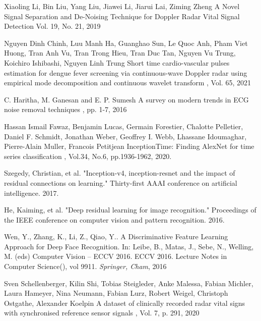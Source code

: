 \begin{bib}[100]
Xiaoling Li, Bin Liu, Yang Liu, Jiawei Li, Jiarui Lai, Ziming Zheng
\newblock A Novel Signal Separation and De-Noising Technique for Doppler Radar Vital Signal Detection
 Vol. 19, No. 21, 2019

Nguyen Dinh Chinh, Luu Manh Ha, Guanghao Sun, Le Quoc Anh, Pham Viet Huong, Tran Anh Vu, Tran Trong Hieu, Tran Duc Tan, Nguyen Vu Trung, Koichiro Ishibashi, Nguyen Linh Trung
\newblock Short time cardio-vascular pulses estimation for dengue fever screening via continuous-wave Doppler radar using empirical mode decomposition and continuous wavelet transform
, Vol. 65, 2021

C. Haritha, M. Ganesan and E. P. Sumesh
\newblock A survey on modern trends in ECG noise removal techniques
, pp. 1-7, 2016 

  Hassan Ismail Fawaz, Benjamin Lucas, Germain Forestier, Chalotte Pelletier, Daniel F. Schmidt, Jonathan Weber, Geoffrey I. Webb, Lhassane Idoumaghar, Pierre-Alain Muller, Francois Petitjean
  \newblock InceptionTime: Finding AlexNet for time series classification
  , Vol.34, No.6, pp.1936-1962, 2020.

Szegedy, Christian, et al. "Inception-v4, inception-resnet and the impact of residual connections on learning." Thirty-first AAAI conference on artificial intelligence. 2017.

He, Kaiming, et al. "Deep residual learning for image recognition." Proceedings of the IEEE conference on computer vision and pattern recognition. 2016.

Wen, Y., Zhang, K., Li, Z., Qiao, Y.. A Discriminative Feature Learning Approach for Deep Face Recognition. In: Leibe, B., Matas, J., Sebe, N., Welling, M. (eds) Computer Vision – ECCV 2016. ECCV 2016. Lecture Notes in Computer Science(), vol 9911. {\it Springer, Cham}, 2016

Sven Schellenberger, Kilin Shi, Tobias Steigleder, Anke Malessa, Fabian Michler, Laura Hameyer, Nina Neumann, Fabian Lurz, Robert Weigel, Christoph Ostgathe, Alexander Koelpin
\newblock A dataset of clinically recorded radar vital signs with synchronised reference sensor signals
, Vol. 7, p. 291, 2020

\end{bib}

